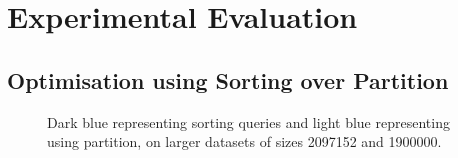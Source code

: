 \section{Experimental Evaluation}
\label{sec:eval}





\subsection{Optimisation using Sorting over Partition}


\begin{figure}[H]
  \centering
  \caption{Dark blue representing sorting queries and light blue representing using partition, on larger datasets of sizes 2097152 and 1900000.}
\end{figure}


